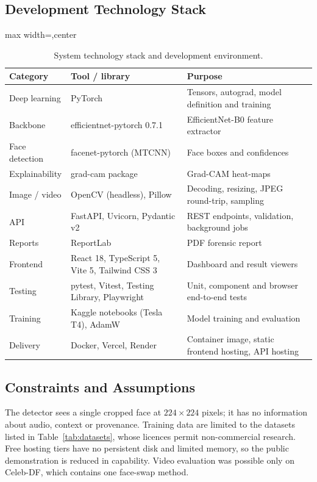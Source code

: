 \subsection{Development Technology Stack}
\begin{table}[ht]
\centering
\caption{System technology stack and development environment.}
\label{tab:stack}
\small
\begin{adjustbox}{max width=\linewidth,center}
\begin{tabular}{|p{2.6cm}|p{3.4cm}|p{5.8cm}|}
\hline
\textbf{Category} & \textbf{Tool / library} & \textbf{Purpose} \\ \hline
Deep learning & PyTorch \citep{paszke2019pytorch} & Tensors, autograd, model definition and training \\ \hline
Backbone & efficientnet-pytorch 0.7.1 & EfficientNet-B0 feature extractor \citep{tan2019efficientnet} \\ \hline
Face detection & facenet-pytorch (MTCNN) & Face boxes and confidences \citep{zhang2016mtcnn} \\ \hline
Explainability & grad-cam package & Grad-CAM heat-maps \citep{selvaraju2017gradcam} \\ \hline
Image / video & OpenCV (headless), Pillow & Decoding, resizing, JPEG round-trip, sampling \\ \hline
API & FastAPI, Uvicorn, Pydantic v2 & REST endpoints, validation, background jobs \\ \hline
Reports & ReportLab & PDF forensic report \\ \hline
Frontend & React 18, TypeScript 5, Vite 5, Tailwind CSS 3 & Dashboard and result viewers \\ \hline
Testing & pytest, Vitest, Testing Library, Playwright & Unit, component and browser end-to-end tests \\ \hline
Training & Kaggle notebooks (Tesla T4), AdamW \citep{loshchilov2019adamw} & Model training and evaluation \\ \hline
Delivery & Docker, Vercel, Render & Container image, static frontend hosting, API hosting \\ \hline
\end{tabular}
\end{adjustbox}
\end{table}

\subsection{Constraints and Assumptions}
The detector sees a single cropped face at $224\times224$ pixels; it has no information about audio, context or provenance. Training data
are limited to the datasets listed in Table~\ref{tab:datasets}, whose licences permit non-commercial research. Free hosting tiers have no
persistent disk and limited memory, so the public demonstration is reduced in capability. Video evaluation was possible only on
Celeb-DF, which contains one face-swap method.
